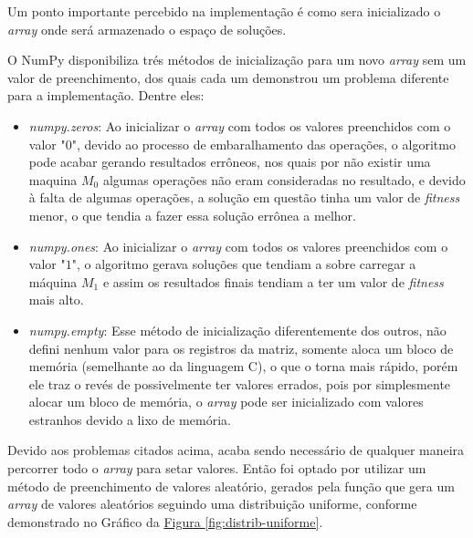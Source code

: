                 Um ponto importante percebido na implementação é como sera inicializado o \textit{array} onde será armazenado o espaço de soluções.\newline

                O NumPy disponibiliza trés métodos de inicialização para um novo \textit{array} sem um valor de preenchimento, dos quais cada um demonstrou um problema diferente para a implementação. Dentre eles: 
                \begin{itemize}
                    \item \textit{numpy.zeros}: Ao inicializar o \textit{array} com todos os valores preenchidos com o valor "$0$", devido ao processo de embaralhamento das operações, o algoritmo pode acabar gerando resultados errôneos, nos quais por não existir uma maquina $M_0$ algumas operações não eram consideradas no resultado, e devido à falta de algumas operações, a solução em questão tinha um valor de \textit{fitness} menor, o que tendia a fazer essa solução errônea a melhor.

                    \item \textit{numpy.ones}: Ao inicializar o \textit{array} com todos os valores preenchidos com o valor "$1$", o algoritmo gerava soluções que tendiam a sobre carregar a máquina $M_1$ e assim os resultados finais tendiam a ter um valor de \textit{fitness} mais alto.

                    \item \textit{numpy.empty}: Esse método de inicialização diferentemente dos outros, não defini nenhum valor para os registros da matriz, somente aloca um bloco de memória (semelhante ao  da linguagem C), o que o torna mais rápido, porém ele traz o revés de possivelmente ter valores errados, pois por simplesmente alocar um bloco de memória, o \textit{array} pode ser inicializado com valores estranhos devido a lixo de memória.
                \end{itemize}

                \noindent Devido aos problemas citados acima, acaba sendo necessário de qualquer maneira percorrer todo o \textit{array} para setar valores. \newline 
                Então foi optado por utilizar um método de preenchimento de valores aleatório, 
                gerados pela função  que gera um \textit{array} de valores aleatórios seguindo uma distribuição uniforme, 
                conforme demonstrado no Gráfico da \hyperref[fig:distrib-uniforme]{Figura \ref{fig:distrib-uniforme}}.

